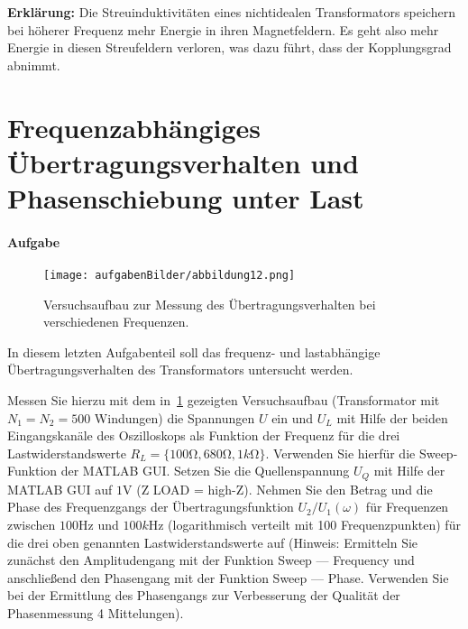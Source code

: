 \documentclass[10pt]{scrreprt}
\begin{document}
        \textbf{Erklärung:}
        Die Streuinduktivitäten eines nichtidealen Transformators speichern bei höherer
        Frequenz mehr Energie in ihren Magnetfeldern. Es geht also mehr Energie in diesen
        Streufeldern verloren, was dazu führt, dass der Kopplungsgrad abnimmt.


        \section{Frequenzabhängiges Übertragungsverhalten und Phasenschiebung unter Last}
        \paragraph{Aufgabe}
        \begin{center}
            \begin{figure}[H]
                \texttt{[image: aufgabenBilder/abbildung12.png]}
                \caption{Versuchsaufbau zur Messung des Übertragungsverhalten bei verschiedenen Frequenzen.}
                \label{fig:abb12}
            \end{figure}
        \end{center}

        In diesem letzten Aufgabenteil soll das frequenz- und lastabhängige Übertragungsverhalten
        des Transformators untersucht werden.

        \vspace{0.5cm}

        Messen Sie hierzu mit dem in~\ref{fig:abb12} gezeigten Versuchsaufbau (Transformator mit
        $N_1 = N_2 = 500$ Windungen) die Spannungen $U$ ein und $U_L$ mit Hilfe der beiden Eingangskanäle
        des Oszilloskops als Funktion der Frequenz für die drei Lastwiderstandswerte
        $R_L = \{100\si{\ohm}, 680 \si{\ohm}, 1 \si{k\ohm}\}$. Verwenden Sie hierfür die Sweep-Funktion der MATLAB GUI.
        Setzen Sie die Quellenspannung $U_Q$ mit Hilfe der MATLAB GUI auf $1\si{\volt}$ (Z LOAD = high-Z).
        Nehmen Sie den Betrag und die Phase des Frequenzgangs der Übertragungsfunktion
        $U_2 /U_1 (\omega)$ für Frequenzen zwischen $100\si{\hertz}$ und $100\si{k\hertz}$ (logarithmisch verteilt mit 100
        Frequenzpunkten) für die drei oben genannten Lastwiderstandswerte auf (Hinweis:
        Ermitteln Sie zunächst den Amplitudengang mit der Funktion \glqq{}Sweep --- Frequency\grqq{} und
        anschließend den Phasengang mit der Funktion \glqq{}Sweep --- Phase\grqq{}. Verwenden Sie bei der
        Ermittlung des Phasengangs zur Verbesserung der Qualität der Phasenmessung 4 Mittelungen).
\end{document}
